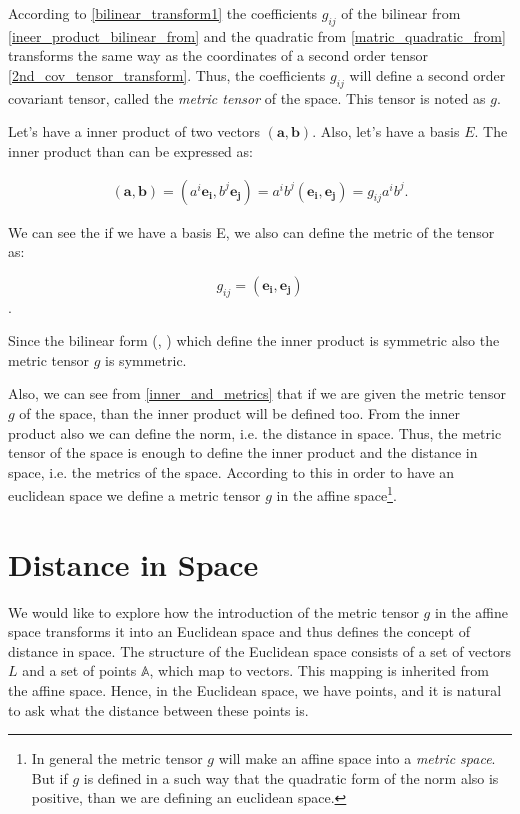 \documentclass{book}
\begin{document}
According to \eqref{bilinear_transform1} the coefficients $g_{ij}$ of the bilinear from \eqref{ineer_product_bilinear_from} and the quadratic from \eqref{matric_quadratic_from} transforms the same way as the coordinates of a second order tensor \eqref{2nd_cov_tensor_transform}. Thus, the coefficients $g_{ij}$ will define a second order covariant tensor, called the \emph{metric tensor} of the space. This tensor is noted as $g$.

Let's have a inner product of two vectors $(\boldsymbol{a}, \boldsymbol{b})$. Also, let's have a basis $E$. The inner product than can be expressed as:

\begin{align}
(\boldsymbol{a}, \boldsymbol{b}) = (a^i \boldsymbol{e_i}, b^j\boldsymbol{e_j}) = a^{i}b^{j} (\boldsymbol{e_i}, \boldsymbol{e_j}) = g_{ij} a^{i}b^{j}. \label{inner_and_metrics}
\end{align}

We can see the if we have a basis E, we also can define the metric of the tensor as:

\[g_{ij} = (\boldsymbol{e_i}, \boldsymbol{e_j})\].

Since the bilinear form (, ) which define the inner product is symmetric also the metric tensor $g$ is symmetric.

Also, we can see from \eqref{inner_and_metrics} that if we are given the metric tensor $g$ of the space, than the inner product will be defined too. From the inner product also we can define the norm, i.e. the distance in space. Thus, the metric tensor of the space is enough to define the inner product and the distance in space, i.e. the metrics of the space. According to this in order to have an euclidean space we define a metric tensor $g$ in the affine space\footnote{In general the metric tensor $g$ will make an affine space into a \emph{metric space}. But if $g$ is defined in a such way that the quadratic form of the norm also is positive, than we are defining an euclidean space.}.

\section{Distance in Space}

We would like to explore how the introduction of the metric tensor $g$ in the affine space transforms it into an Euclidean space and thus defines the concept of distance in space. The structure of the Euclidean space consists of a set of vectors $L$ and a set of points $\mathbb{A}$, which map to vectors. This mapping is inherited from the affine space. Hence, in the Euclidean space, we have points, and it is natural to ask what the distance between these points is.
\end{document}
